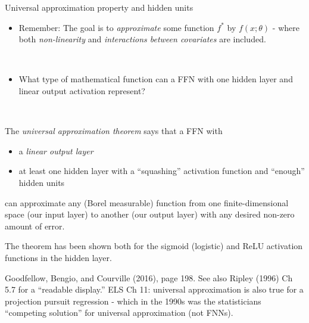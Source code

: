 \documentclass[
  ignorenonframetext,
]{beamer}
\providecommand{\tightlist}{%
  \setlength{\itemsep}{0pt}\setlength{\parskip}{0pt}}
\begin{document}
\begin{frame}
\begin{block}{Universal approximation property and hidden units}
\protect\hypertarget{universal-approximation-property-and-hidden-units}{}
\(~\)

\begin{itemize}
\tightlist
\item
  Remember: The goal is to \emph{approximate} some function \(f^*\) by
  \(f(x;\theta)\) - where both \emph{non-linearity} and
  \emph{interactions between covariates} are included.
\end{itemize}

\(~\)

\begin{itemize}
\tightlist
\item
  What type of mathematical function can a FFN with one hidden layer and
  linear output activation represent?
\end{itemize}

\(~\)
\end{block}
\end{frame}

\begin{frame}
The \emph{universal approximation theorem} says that a FFN with

\begin{itemize}
\tightlist
\item
  a \emph{linear output layer}
\item
  at least one hidden layer with a ``squashing'' activation function and
  ``enough'' hidden units
\end{itemize}

can approximate any (Borel measurable) function from one
finite-dimensional space (our input layer) to another (our output layer)
with any desired non-zero amount of error.

The theorem has been shown both for the sigmoid (logistic) and ReLU
activation functions in the hidden layer.
\end{frame}

\begin{frame}
Goodfellow, Bengio, and Courville (2016), page 198. See also Ripley
(1996) Ch 5.7 for a ``readable display.'' ELS Ch 11: universal
approximation is also true for a projection pursuit regression - which
in the 1990s was the statisticians ``competing solution'' for universal
approximation (not FNNs).
\end{frame}
\end{document}
